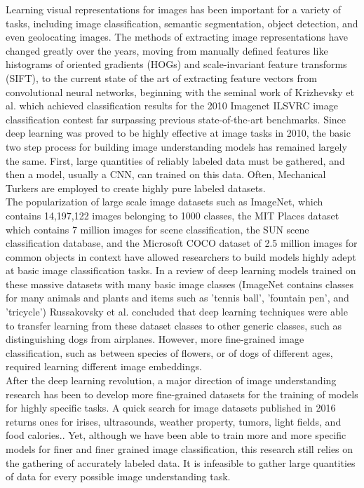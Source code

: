 \documentclass[pageno]{jpaper}
\begin{document}
Learning visual representations for images has been important for a variety of tasks, including image classification, semantic segmentation, object detection, and even geolocating images. The methods of extracting image representations have changed greatly over the years, moving from manually defined features like histograms of oriented gradients (HOGs) and scale-invariant feature transforms (SIFT)\cite{lowe1999object}\cite{dalal2005histograms}, to the current state of the art of extracting feature vectors from convolutional neural networks, beginning with the seminal work of Krizhevsky et al. which achieved classification results for the 2010 Imagenet ILSVRC image classification contest far surpassing previous state-of-the-art benchmarks\cite{krizhevsky2012imagenet}. Since deep learning was proved to be highly effective at image tasks in 2010, the basic two step process for building image understanding models has remained largely the same. First, large quantities of reliably labeled data must be gathered, and then a model, usually a CNN, can trained on this data. Often, Mechanical Turkers are employed to create highly pure labeled datasets.\\

The popularization of large scale image datasets such as ImageNet, which contains 14,197,122 images belonging to 1000 classes\cite{deng2009imagenet}, the MIT Places dataset which contains 7 million images for scene classification\cite{zhou2014learning}, the SUN scene classification database\cite{xiao2010sun}, and the Microsoft COCO dataset of 2.5 million images for common objects in context\cite{lin2014microsoft} have allowed researchers to build models highly adept at basic image classification tasks\cite{russakovsky2013detecting}. In a review of deep learning models trained on these massive datasets with many basic image classes (ImageNet contains classes for many animals and plants and items such as 'tennis ball', 'fountain pen', and 'tricycle') Russakovsky et al. concluded that deep learning techniques were able to transfer learning from these dataset classes to other generic classes, such as distinguishing dogs from airplanes.\cite{russakovsky2013detecting} However, more fine-grained image classification, such as between species of flowers, or of dogs of different ages, required learning different image embeddings.\\

After the deep learning revolution, a major direction of image understanding research has been to develop more fine-grained datasets for the training of models for highly specific tasks. A quick search for image datasets published in 2016 returns ones for irises, ultrasounds, weather property, tumors, light fields, and food calories.\cite{bowyer2016nd}\cite{cortes2016ultrasound}\cite{chu2016image2weather}\cite{shi2016stacked}\cite{paudyal2016smart}\cite{pouladzadeh2015foodd}. Yet, although we have been able to train more and more specific models for finer and finer grained image classification, this research still relies on the gathering of accurately labeled data. It is infeasible to gather large quantities of data for every possible image understanding task.\\
\end{document}

